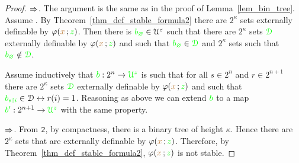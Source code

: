 \begin{proof}
  $\Rightarrow$.
  The argument is the same as in the proof of Lemma~\ref{lem_bin_tree}.
  Assume .
  By Theorem~\ref{thm_def_stable_formula2} there are $2^\kappa$ sets externally definable by $\varphi({\color{brown} x}\,;{\color{green} z})$.
  Then there is ${\color{green} b_\varnothing}\in{\EuScript U^z}$ such that there are $2^\kappa$ sets ${\color{green}\EuScript D}$ externally definable by $\varphi({\color{brown} x}\,;{\color{green} z})$ and such that ${\color{green} b_\varnothing}\in{\color{green}\EuScript D}$ and $2^\kappa$ sets such that ${\color{green} b_\varnothing}\notin{\color{green}\EuScript D}$.

  Assume inductively that ${\color{green} b}:2^n\to{\color{green}\EuScript U^z}$ is such that for all $s\in2^n$ and $r\in2^{n+1}$ there are $2^\kappa$ sets ${\color{green}\EuScript D}$ externally definable by $\varphi({\color{brown} x}\,;{\color{green} z})$ and such that ${\color{green} b_{s\restriction i}}\in\EuScript D\leftrightarrow r(i)=1$.
  Reasoning as above we can extend ${\color{green} b}$ to a map ${\color{green} b'}:2^{n+1}\to{\color{green}\EuScript U^z}$ with the same property.

  


  






  $\Rightarrow$. From $\textsf{\small 2}$, by compactness, there is a binary tree of height $\kappa$. 
  Hence there are $2^\kappa$ sets that are externally definable by $\varphi({\color{brown} x}\,;{\color{green} z})$.
  Therefore, by Theorem~\ref{thm_def_stable_formula2}, $\varphi({\color{brown} x}\,;{\color{green} z})$ is not stable.
\end{proof}


